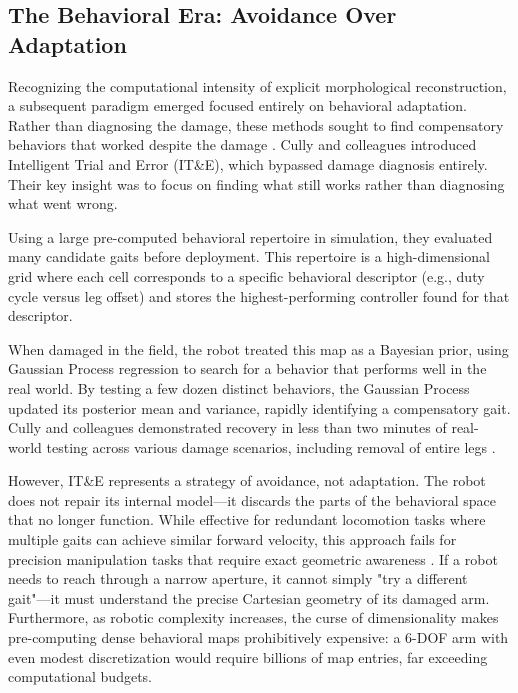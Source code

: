 ﻿\documentclass[12pt,a4paper,oneside]{report}
\begin{document}
\subsection{The Behavioral Era: Avoidance Over Adaptation}

Recognizing the computational intensity of explicit morphological reconstruction, a subsequent paradigm emerged focused entirely on behavioral adaptation. Rather than diagnosing the damage, these methods sought to find compensatory behaviors that worked despite the damage \cite{cully2015robots}. Cully and colleagues introduced Intelligent Trial and Error (IT\&E), which bypassed damage diagnosis entirely. Their key insight was to focus on finding what still works rather than diagnosing what went wrong.

Using a large pre-computed behavioral repertoire in simulation, they evaluated many candidate gaits before deployment. This repertoire is a high-dimensional grid where each cell corresponds to a specific behavioral descriptor (e.g., duty cycle versus leg offset) and stores the highest-performing controller found for that descriptor.

When damaged in the field, the robot treated this map as a Bayesian prior, using Gaussian Process regression to search for a behavior that performs well in the real world. By testing a few dozen distinct behaviors, the Gaussian Process updated its posterior mean and variance, rapidly identifying a compensatory gait. Cully and colleagues demonstrated recovery in less than two minutes of real-world testing across various damage scenarios, including removal of entire legs \cite{cully2015robots}.

However, IT\&E represents a strategy of avoidance, not adaptation. The robot does not repair its internal model---it discards the parts of the behavioral space that no longer function. While effective for redundant locomotion tasks where multiple gaits can achieve similar forward velocity, this approach fails for precision manipulation tasks that require exact geometric awareness \cite{kwiatkowski2019task}. If a robot needs to reach through a narrow aperture, it cannot simply "try a different gait"---it must understand the precise Cartesian geometry of its damaged arm. Furthermore, as robotic complexity increases, the curse of dimensionality makes pre-computing dense behavioral maps prohibitively expensive: a 6-DOF arm with even modest discretization would require billions of map entries, far exceeding computational budgets.
\end{document}
